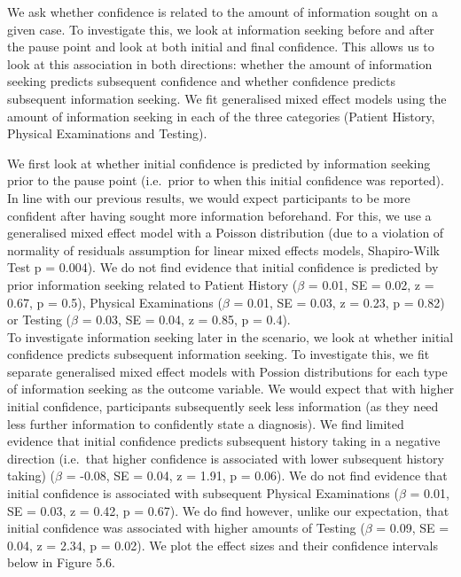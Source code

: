 \documentclass[a4paper, nobind]{templates/ociamthesis}
\begin{document}
We ask whether confidence is related to the amount of information sought on a given case. To investigate this, we look at information seeking before and after the pause point and look at both initial and final confidence. This allows us to look at this association in both directions: whether the amount of information seeking predicts subsequent confidence and whether confidence predicts subsequent information seeking. We fit generalised mixed effect models using the amount of information seeking in each of the three categories (Patient History, Physical Examinations and Testing).

\hfill\break
We first look at whether initial confidence is predicted by information seeking prior to the pause point (i.e.~prior to when this initial confidence was reported). In line with our previous results, we would expect participants to be more confident after having sought more information beforehand. For this, we use a generalised mixed effect model with a Poisson distribution (due to a violation of normality of residuals assumption for linear mixed effects models, Shapiro-Wilk Test p = 0.004). We do not find evidence that initial confidence is predicted by prior information seeking related to Patient History (\(\beta\) = 0.01, SE = 0.02, z = 0.67, p = 0.5), Physical Examinations (\(\beta\) = 0.01, SE = 0.03, z = 0.23, p = 0.82) or Testing (\(\beta\) = 0.03, SE = 0.04, z = 0.85, p = 0.4).\\

To investigate information seeking later in the scenario, we look at whether initial confidence predicts subsequent information seeking. To investigate this, we fit separate generalised mixed effect models with Possion distributions for each type of information seeking as the outcome variable. We would expect that with higher initial confidence, participants subsequently seek less information (as they need less further information to confidently state a diagnosis). We find limited evidence that initial confidence predicts subsequent history taking in a negative direction (i.e.~that higher confidence is associated with lower subsequent history taking) (\(\beta\) = -0.08, SE = 0.04, z = 1.91, p = 0.06). We do not find evidence that initial confidence is associated with subsequent Physical Examinations (\(\beta\) = 0.01, SE = 0.03, z = 0.42, p = 0.67). We do find however, unlike our expectation, that initial confidence was associated with higher amounts of Testing (\(\beta\) = 0.09, SE = 0.04, z = 2.34, p = 0.02). We plot the effect sizes and their confidence intervals below in Figure 5.6.
\end{document}
